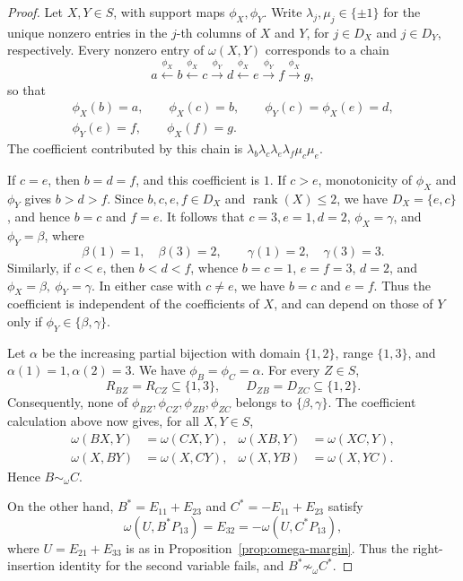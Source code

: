 \documentclass[11pt,a4paper,reqno]{amsart}
\numberwithin{equation}{section}
\begin{document}
\begin{proof}
Let $X,Y\in S$, with support maps $\phi_X,\phi_Y$. Write $\lambda_j,\mu_j\in\{\pm1\}$ for the unique nonzero entries in the $j$-th columns of $X$ and $Y$, for $j\in D_X$ and $j\in D_Y$, respectively. Every nonzero entry of $\omega(X,Y)$ corresponds to a chain
\[
a\xleftarrow{\phi_X}b\xleftarrow{\phi_X}c
 \xrightarrow{\phi_Y}d\xleftarrow{\phi_X}e
 \xrightarrow{\phi_Y}f\xrightarrow{\phi_X}g,
\]
so that
\[
\begin{gathered}
\phi_X(b)=a,\qquad \phi_X(c)=b,\qquad \phi_Y(c)=\phi_X(e)=d,\\
\phi_Y(e)=f,\qquad \phi_X(f)=g.
\end{gathered}
\]
The coefficient contributed by this chain is $\lambda_b\lambda_c\lambda_e\lambda_f\mu_c\mu_e$.

If $c=e$, then $b=d=f$, and this coefficient is $1$. If $c>e$, monotonicity of $\phi_X$ and $\phi_Y$ gives $b>d>f$. Since $b,c,e,f\in D_X$ and $\operatorname{rank}(X)\le2$, we have $D_X=\{e,c\}$, and hence $b=c$ and $f=e$. It follows that $c=3,e=1,d=2$, $\phi_X=\gamma$, and $\phi_Y=\beta$, where
\[
\beta(1)=1,\quad\beta(3)=2,\qquad
\gamma(1)=2,\quad\gamma(3)=3.
\]
Similarly, if $c<e$, then $b<d<f$, whence $b=c=1$, $e=f=3$, $d=2$, and $\phi_X=\beta,\ \phi_Y=\gamma$. In either case with $c\ne e$, we have $b=c$ and $e=f$. Thus the coefficient is independent of the coefficients of $X$, and can depend on those of $Y$ only if $\phi_Y\in\{\beta,\gamma\}$.

Let $\alpha$ be the increasing partial bijection with domain $\{1,2\}$, range $\{1,3\}$, and $\alpha(1)=1,\alpha(2)=3$. We have $\phi_B=\phi_C=\alpha$. For every $Z\in S$,
\[
R_{BZ}=R_{CZ}\subseteq\{1,3\},\qquad
D_{ZB}=D_{ZC}\subseteq\{1,2\}.
\]
Consequently, none of $\phi_{BZ},\phi_{CZ},\phi_{ZB},\phi_{ZC}$ belongs to $\{\beta,\gamma\}$. The coefficient calculation above now gives, for all $X,Y\in S$,
\[
\begin{aligned}
\omega(BX,Y)&=\omega(CX,Y),&
\omega(XB,Y)&=\omega(XC,Y),\\
\omega(X,BY)&=\omega(X,CY),&
\omega(X,YB)&=\omega(X,YC).
\end{aligned}
\]
Hence $B\sim_\omega C$.

On the other hand, $B^*=E_{11}+E_{23}$ and $C^*=-E_{11}+E_{23}$ satisfy
\[
\omega(U,B^*P_{13})=E_{32}=-\omega(U,C^*P_{13}),
\]
where $U=E_{21}+E_{33}$ is as in Proposition~\ref{prop:omega-margin}. Thus the right-insertion identity for the second variable fails, and $B^*\not\sim_\omega C^*$.
\end{proof}
\end{document}
